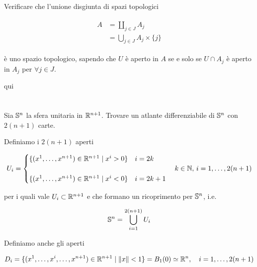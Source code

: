\tocless\section{}\label{BONUS2-1}

\begin{tcolorbox}
	Verificare che l'unione disgiunta di spazi topologici
	
	\begin{align}
		\begin{split}
			A &= \coprod_{j \in J} A_{j}\\
			&= \bigcup_{j \in J} A_{j} \times \{j\}
		\end{split}
	\end{align}
	
	è uno spazio topologico, sapendo che $ U $ è aperto in $ A $ se e solo se $ U \cap A_{j} $ è aperto in $ A_{j} $ per $ \forall j \in J $.
\end{tcolorbox}

qui

\tocless\section{}\label{es2-1}

\begin{tcolorbox}
	Sia $ \S^{n} $ la sfera unitaria in $ \R^{n+1} $. Trovare un atlante differenziabile di $ \S^{n} $ con $ 2(n+1) $ carte.

\end{tcolorbox}

Definiamo i $ 2(n+1) $ aperti

\begin{equation}
	U_{i} = %
	\begin{cases}
		\{ (x^{1},\dots,x^{n+1}) \in \R^{n+1} \mid x^{i} > 0 \} & i = 2k\\\\
		\{ (x^{1},\dots,x^{n+1}) \in \R^{n+1} \mid x^{i} < 0 \} & i = 2k+1
	\end{cases}%
	\quad k \in \N, \, i = 1,\dots,2(n+1)
\end{equation}

per i quali vale $ U_{i} \subset \R^{n+1} $ e che formano un ricoprimento per $ \S^{n} $, i.e.

\begin{equation}
	\S^{n} = \bigcup_{i=1}^{2(n+1)} U_{i}
\end{equation}

Definiamo anche gli aperti

\begin{equation}
	D_{i} = \{ (x^{1},\dots,x^{i},\dots,x^{n+1}) \in \R^{n+1} \mid \norm{x} < 1 \} = B_{1}(0) \simeq \R^{n} \qcomma i = 1,\dots,2(n+1)
\end{equation}

